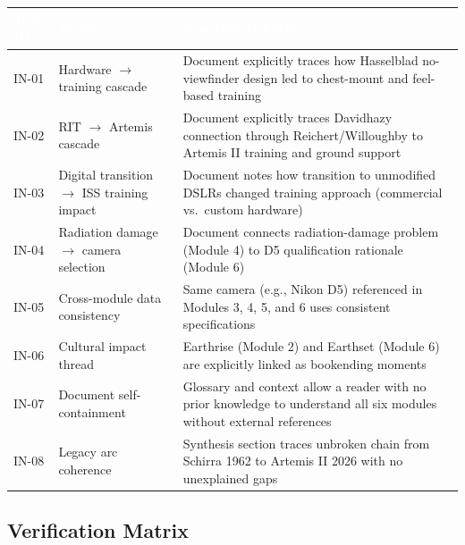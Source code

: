 \documentclass[11pt,letterpaper]{article}
\newcommand{\tableheader}[1]{\textbf{\sffamily\textcolor{white}{#1}}}
\begin{document}
\begin{center}
\begin{tabularx}{\textwidth}{L{1.5cm}L{4.5cm}X}
\toprule
{}
\tableheader{Test ID} & \tableheader{Verifies} & \tableheader{Expected Behavior} \\
\midrule
IN-01 & Hardware $\to$ training cascade & Document explicitly traces how Hasselblad no-viewfinder design led to chest-mount and feel-based training \\
IN-02 & RIT $\to$ Artemis cascade & Document explicitly traces Davidhazy connection through Reichert/Willoughby to Artemis II training and ground support \\
IN-03 & Digital transition $\to$ ISS training impact & Document notes how transition to unmodified DSLRs changed training approach (commercial vs.\ custom hardware) \\
IN-04 & Radiation damage $\to$ camera selection & Document connects radiation-damage problem (Module 4) to D5 qualification rationale (Module 6) \\
IN-05 & Cross-module data consistency & Same camera (e.g., Nikon D5) referenced in Modules 3, 4, 5, and 6 uses consistent specifications \\
IN-06 & Cultural impact thread & Earthrise (Module 2) and Earthset (Module 6) are explicitly linked as bookending moments \\
IN-07 & Document self-containment & Glossary and context allow a reader with no prior knowledge to understand all six modules without external references \\
IN-08 & Legacy arc coherence & Synthesis section traces unbroken chain from Schirra 1962 to Artemis II 2026 with no unexplained gaps \\
\bottomrule
\end{tabularx}
\end{center}

\subsection{Verification Matrix}
\end{document}
